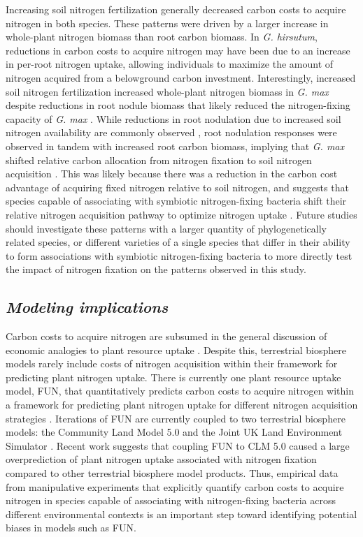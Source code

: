 Increasing soil nitrogen fertilization generally decreased carbon costs to acquire nitrogen in both species. These patterns were driven by a larger increase in whole-plant nitrogen biomass than root carbon biomass. In \textit{G. hirsutum}, reductions in carbon costs to acquire nitrogen may have been due to an increase in per-root nitrogen uptake, allowing individuals to maximize the amount of nitrogen acquired from a belowground carbon investment. Interestingly, increased soil nitrogen fertilization increased whole-plant nitrogen biomass in \textit{G. max} despite reductions in root nodule biomass that likely reduced the nitrogen-fixing capacity of \textit{G. max} . While reductions in root nodulation due to increased soil nitrogen availability are commonly observed , root nodulation responses were observed in tandem with increased root carbon biomass, implying that \textit{G. max} shifted relative carbon allocation from nitrogen fixation to soil nitrogen acquisition . This was likely because there was a reduction in the carbon cost advantage of acquiring fixed nitrogen relative to soil nitrogen, and suggests that species capable of associating with symbiotic nitrogen-fixing bacteria shift their relative nitrogen acquisition pathway to optimize nitrogen uptake . Future studies should investigate these patterns with a larger quantity of phylogenetically related species, or different varieties of a single species that differ in their ability to form associations with symbiotic nitrogen-fixing bacteria to more directly test the impact of nitrogen fixation on the patterns observed in this study.

\subsection{\textit{Modeling implications}}
\noindent Carbon costs to acquire nitrogen are subsumed in the general discussion of economic analogies to plant resource uptake . Despite this, terrestrial biosphere models rarely include costs of nitrogen acquisition within their framework for predicting plant nitrogen uptake. There is currently one plant resource uptake model, FUN, that quantitatively predicts carbon costs to acquire nitrogen within a framework for predicting plant nitrogen uptake for different nitrogen acquisition strategies . Iterations of FUN are currently coupled to two terrestrial biosphere models: the Community Land Model 5.0 and the Joint UK Land Environment Simulator . Recent work suggests that coupling FUN to CLM 5.0 caused a large overprediction of plant nitrogen uptake associated with nitrogen fixation  compared to other terrestrial biosphere model products. Thus, empirical data from manipulative experiments that explicitly quantify carbon costs to acquire nitrogen in species capable of associating with nitrogen-fixing bacteria across different environmental contexts is an important step toward identifying potential biases in models such as FUN.

